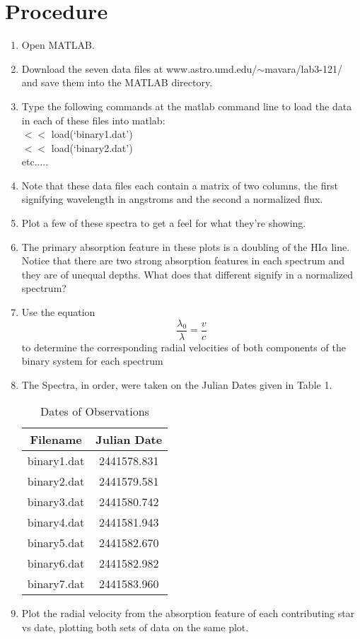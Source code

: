 \documentclass[11pt]{article}
\newcommand{\be}{\begin{equation}}
\newcommand{\ee}{\end{equation}}
\begin{document}
\section{{\bf Procedure}}
\begin{enumerate}
\item Open MATLAB.
\item Download the seven data files at www.astro.umd.edu/$\sim$mavara/lab3-121/ and save them into the MATLAB directory.
\item Type the following commands at the matlab command line to load the data in each of these files into matlab:\\
$<<$ load(`binary1.dat')\\
$<<$ load(`binary2.dat')\\
 	etc.....
\item Note that these data files each contain a matrix of two columns, the first signifying wavelength in angstroms and the second a normalized flux.
\item Plot a few of these spectra to get a feel for what they're showing.
\item The primary absorption feature in these plots is a doubling of the HI$\alpha$ line. Notice that there are two strong absorption features in each spectrum and they are of unequal depths. What does that different signify in a normalized spectrum?
\item Use the equation
\be 
	\frac{\lambda_{0}}{\lambda}=\frac{v}{c}
\ee
to determine the corresponding radial velocities of both components of the binary system for each spectrum
\item The Spectra, in order, were taken on the Julian Dates given in Table 1.
\begin{table}[ht]
\caption{Dates of Observations}
\centering
\begin{tabular}{c c}
\hline \hline
Filename & Julian Date\\ [0.5ex]
\hline 
binary1.dat & 2441578.831 \\
binary2.dat & 2441579.581 \\
binary3.dat & 2441580.742 \\
binary4.dat & 2441581.943 \\
binary5.dat & 2441582.670 \\
binary6.dat & 2441582.982 \\
binary7.dat & 2441583.960 \\
\hline
\end{tabular}
\end{table}
\item Plot the radial velocity from the absorption feature of each contributing star vs date, plotting both sets of data on the same plot.

\end{enumerate}
\end{document}
